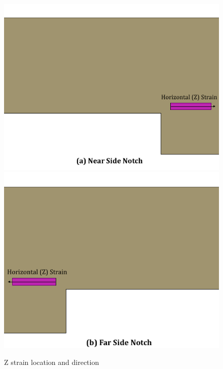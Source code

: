 \documentclass[11pt,a4paper]{article}
\numberwithin{equation}{subsection}
\begin{document}
\vspace*{\baselineskip}

\begin{figure}[h]
	\begin{center}
		\includegraphics[scale=0.35]{Hor_Near}
		\includegraphics[scale=0.35]{Hor_Far}
	\end{center}
	\caption{Z strain location and direction}
	\label{fig:Hor}
\end{figure}
\end{document}
